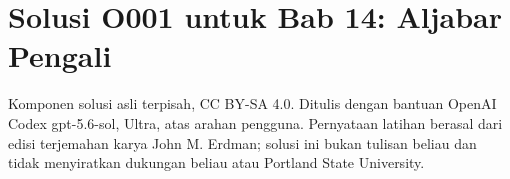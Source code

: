 
\clearpage
{}
\makeatletter
\def\ps@oonechapterxiv{%
  \ps@headings
  \def\@evenhead{%
    \setTrue{runhead}%
    \normalfont\scriptsize
    \rlap{\thepage}\hfil
    \def\thanks{\protect\thanks@warning}%
    SOLUSI O001 UNTUK BAB 14: ALJABAR PENGALI\hfil}%
  \def\@oddhead{%
    \setTrue{runhead}%
    \normalfont\scriptsize\hfil
    \def\thanks{\protect\thanks@warning}%
    SOLUSI O001 UNTUK BAB 14: ALJABAR PENGALI\hfil\llap{\thepage}}%
}
\makeatother
\thispagestyle{oonechapterxiv}
\section*{Solusi O001 untuk Bab 14: Aljabar Pengali}
\begin{center}
\small
Komponen solusi asli terpisah, CC BY-SA 4.0. Ditulis dengan bantuan
OpenAI Codex gpt-5.6-sol, Ultra, atas arahan pengguna. Pernyataan latihan
berasal dari edisi terjemahan karya John M. Erdman; solusi ini bukan tulisan
beliau dan tidak menyiratkan dukungan beliau atau Portland State University.
\end{center}

